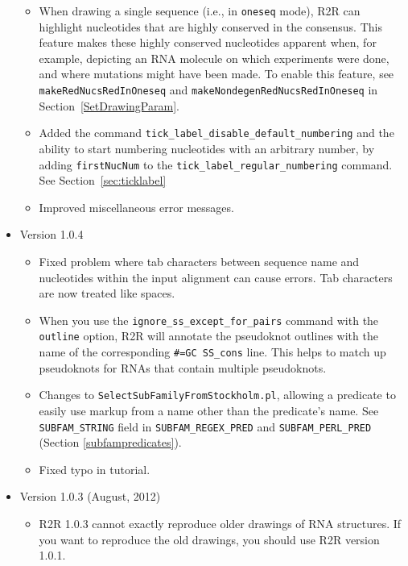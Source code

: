 \documentclass[letterpaper,12pt]{report}
\begin{document}
\begin{itemize}
\begin{itemize}
    \item When drawing a single sequence (i.e., in {\tt oneseq} mode), R2R can highlight nucleotides that are highly conserved in the consensus.  This feature makes these highly conserved nucleotides apparent when, for example, depicting an RNA molecule on which experiments were done, and where mutations might have been made. To enable this feature, see {\tt makeRedNucsRedInOneseq} and {\tt makeNondegenRedNucsRedInOneseq} in Section~\ref{SetDrawingParam}.
    \item Added the command {\tt tick\_label\_disable\_default\_numbering} and the ability to start numbering nucleotides with an arbitrary number, by adding {\tt firstNucNum} to the {\tt tick\_label\_regular\_numbering} command. See Section~\ref{sec:ticklabel}
    \item Improved miscellaneous error messages.
    \end{itemize}
\item Version 1.0.4
	\begin{itemize}
          \item Fixed problem where tab characters between sequence name and nucleotides within the input alignment can cause errors.  Tab characters are now treated like spaces.
          \item When you use the {\tt ignore\_ss\_except\_for\_pairs} command with the {\tt outline} option, R2R will annotate the pseudoknot outlines with the name of the corresponding {\tt \#=GC SS\_cons} line.  This helps to match up pseudoknots for RNAs that contain multiple pseudoknots.
            \item Changes to {\tt SelectSubFamilyFromStockholm.pl}, allowing a predicate to easily use markup from a name other than the predicate's name.  See {\tt SUBFAM\_STRING} field in {\tt SUBFAM\_REGEX\_PRED} and {\tt SUBFAM\_PERL\_PRED} (Section \ref{subfampredicates}).
          \item Fixed typo in tutorial.
	\end{itemize}
\item Version 1.0.3 (August, 2012)
        \begin{itemize}
	\item R2R 1.0.3 cannot exactly reproduce older drawings of RNA structures.  If you want to reproduce the old drawings, you should use R2R version 1.0.1.


\end{itemize}
\end{itemize}
\end{document}
